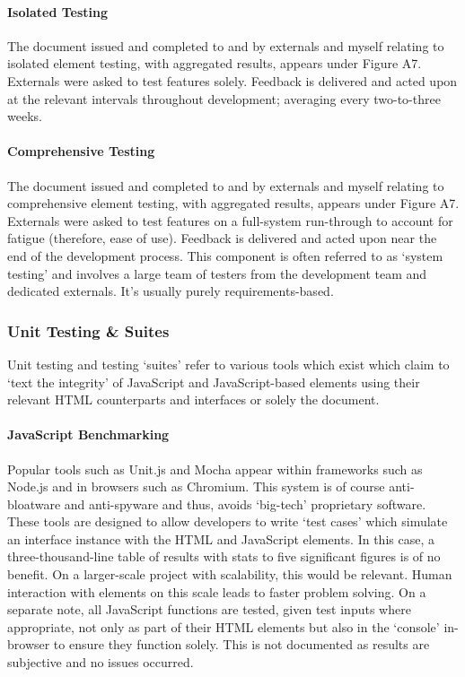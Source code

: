 \documentclass[11pt, english]{article}
\begin{document}
			\paragraph{Isolated Testing}

	The document issued and completed to and by externals and myself relating to isolated element testing, with aggregated results, appears under Figure A7. Externals were asked to test features solely. Feedback is delivered and acted upon at the relevant intervals throughout development; averaging every two-to-three weeks.

			\paragraph{Comprehensive Testing}

	The document issued and completed to and by externals and myself relating to comprehensive element testing, with aggregated results, appears under Figure A7. Externals were asked to test features on a full-system run-through to account for fatigue (therefore, ease of use). Feedback is delivered and acted upon near the end of the development process. This component is often referred to as `system testing' and involves a large team of testers from the development team and dedicated externals. It's usually purely requirements-based.

		\subsubsection{Unit Testing \& Suites}

	Unit testing and testing `suites' refer to various tools which exist which claim to `text the integrity' of JavaScript and JavaScript-based elements using their relevant HTML counterparts and interfaces or solely the document.

			\paragraph{JavaScript Benchmarking}

 	Popular tools such as Unit.js and Mocha appear within frameworks such as Node.js and in browsers such as Chromium. This system is of course anti-bloatware and anti-spyware and thus, avoids `big-tech' proprietary software. These tools are designed to allow developers to write `test cases' which simulate an interface instance with the HTML and JavaScript elements. In this case, a three-thousand-line table of results with stats to five significant figures is of no benefit. On a larger-scale project with scalability, this would be relevant. Human interaction with elements on this scale leads to faster problem solving. On a separate note, all JavaScript functions are tested, given test inputs where appropriate, not only as part of their HTML elements but also in the `console' in-browser to ensure they function solely. This is not documented as results are subjective and no issues occurred.
\end{document}
